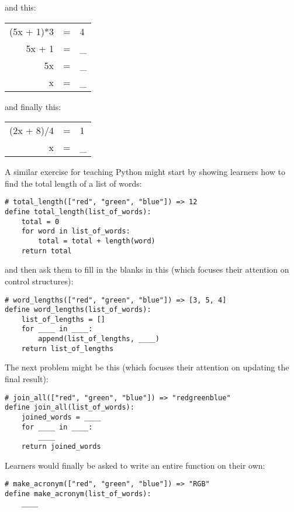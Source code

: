 \noindent
and this:

\begin{center}
\begin{tabular}{rcl}
  (5x + 1)*3	& = &	4	\\
  5x + 1	& = &	\_ 	\\
  5x		& = &	\_ 	\\
  x		& = &	\_
\end{tabular}
\end{center}

\noindent
and finally this:

\begin{center}
\begin{tabular}{rcl}
  (2x + 8)/4	& = &	1	\\
   x		& = &	\_
\end{tabular}
\end{center}

A similar exercise for teaching Python might start by showing learners
how to find the total length of a list of words:

\begin{verbatim}
# total_length(["red", "green", "blue"]) => 12
define total_length(list_of_words):
    total = 0
    for word in list_of_words:
        total = total + length(word)
    return total
\end{verbatim}

\noindent
and then ask them to fill in the blanks in this
(which focuses their attention on control structures):

\begin{verbatim}
# word_lengths(["red", "green", "blue"]) => [3, 5, 4]
define word_lengths(list_of_words):
    list_of_lengths = []
    for ____ in ____:
        append(list_of_lengths, ____)
    return list_of_lengths
\end{verbatim}

The next problem might be this
(which focuses their attention on updating the final result):

\begin{verbatim}
# join_all(["red", "green", "blue"]) => "redgreenblue"
define join_all(list_of_words):
    joined_words = ____
    for ____ in ____:
        ____
    return joined_words
\end{verbatim}

Learners would finally be asked to write an entire function on their own:

\begin{verbatim}
# make_acronym(["red", "green", "blue"]) => "RGB"
define make_acronym(list_of_words):
    ____
\end{verbatim}

